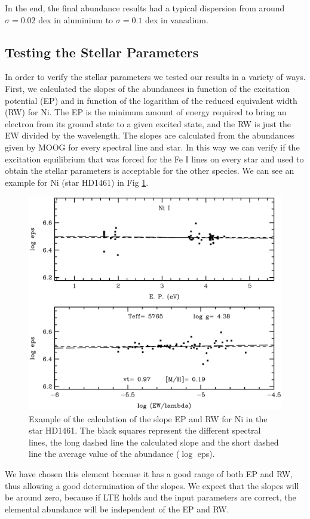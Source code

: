 \documentclass[dvips,12pt,a4paper]{report}
\begin{document}
{{In the end, the final abundance results had a typical dispersion from around $\sigma=0.02$ dex in aluminium to $\sigma=0.1$ dex in vanadium.


\subsection {Testing the Stellar Parameters}
\label{testpar}
In order to verify the stellar parameters we tested our results in a variety of ways. First, we calculated the slopes of the abundances in function of the excitation potential (EP) and in function of the logarithm of the reduced equivalent width (RW) for Ni. The EP is the minimum amount of energy required to bring an electron from its ground state to a given excited state, and the RW is just the EW divided by the wavelength. The slopes are calculated from the abundances given by MOOG for every spectral line and star. In this way we can verify if the excitation equilibrium that was forced for the Fe I lines on every star and used to obtain the stellar parameters \citep{Santos-2000b} is acceptable for the other species. We can see an example for Ni (star HD1461) in Fig \ref{exslope}.
\begin{figure}[h]
\centering
\includegraphics[trim=0mm 0mm 0mm 10mm, clip,width= 10 cm]{pics/parte3/moogpicniq.eps}
\caption[Example of the calculation for Ni of the slope EP and RW]{Example of the calculation of the slope EP and RW for Ni in the star HD1461. The black squares represent the different spectral lines, the long dashed line the calculated slope and the short dashed line the average value of the abundance ($\log$ eps).}
\label{exslope}
\end{figure}
We have chosen this element because it has a good range of both EP and RW, thus allowing a good determination of the slopes. %
We expect that the slopes will be around zero, because if LTE holds and the input parameters are correct, the elemental abundance will be independent of the EP and RW. 

}}
\end{document}
